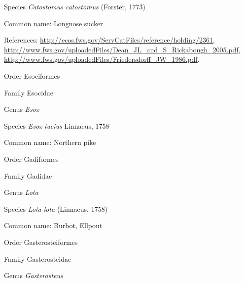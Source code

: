 \documentclass[9pt, article]{memoir}
\begin{document}
\begin{multicols}{2}
\vspace{6pt}\noindent\hspace{36pt}Species \textit{Catostomus catostomus} (Forster, 1773)


Common name: Longnose sucker

References: 
\url{http://ecos.fws.gov/ServCatFiles/reference/holding/2361}, 
\url{http://www.fws.gov/uploadedFiles/Dean_JL_and_S_Rickabough_2005.pdf}, 
\url{http://www.fws.gov/uploadedFiles/Friedersdorff_JW_1986.pdf}.

\vspace{6pt}\noindent\hspace{18pt}Order Esociformes


\vspace{6pt}\noindent\hspace{24pt}Family Esocidae


\vspace{6pt}\noindent\hspace{30pt}Genus \textit{Esox}


\vspace{6pt}\noindent\hspace{36pt}Species \textit{Esox lucius} Linnaeus, 1758


Common name: Northern pike

\vspace{6pt}\noindent\hspace{18pt}Order Gadiformes


\vspace{6pt}\noindent\hspace{24pt}Family Gadidae


\vspace{6pt}\noindent\hspace{30pt}Genus \textit{Lota}


\vspace{6pt}\noindent\hspace{36pt}Species \textit{Lota lota} (Linnaeus, 1758)


Common name: Burbot, Ellpout

\vspace{6pt}\noindent\hspace{18pt}Order Gasterosteiformes


\vspace{6pt}\noindent\hspace{24pt}Family Gasterosteidae


\vspace{6pt}\noindent\hspace{30pt}Genus \textit{Gasterosteus}



\end{multicols}
\end{document}

